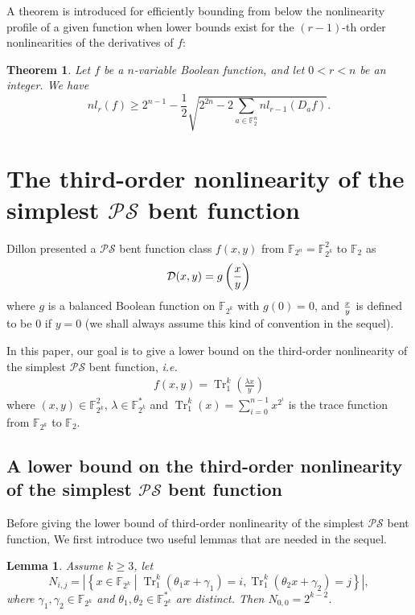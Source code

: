 \documentclass{article}
\newcommand{\F}{\mathbb{F}}
\newcommand{\0}{\textbf{0}}
\newcommand{\1}{\textbf{1}}
\newcommand{\TRACE}{\operatorname{Tr}_1^k}
\theoremstyle{plain}
\newtheorem{lemma}{Lemma}
\newtheorem{theorem}{Theorem}
\theoremstyle{nonumberplain}
\begin{document}
    A theorem is introduced for efficiently bounding from below 
    the nonlinearity profile of a given function when lower bounds exist
    for the $ (r-1) $-th order nonlinearities of the derivatives of $ f $:
   \begin{theorem}\cite{C2007book}\label{thm:High_order_nl_bound}
        Let $ f $ be a $ n $-variable Boolean function, and let $ 0<r<n $ be an integer. We have 
        \[nl_r(f)\ge 2^{n-1}-\frac{1}{2}\sqrt{2^{2n}-2\sum_{a\in\F_2^n}nl_{r-1}(D_af)}.\] 
   \end{theorem}
  
\section{The third-order nonlinearity of the simplest $ \mathcal{PS} $ bent function}

    Dillon presented a $ \mathcal{PS} $ bent function class $ f(x,y) $ from $ \F_{2^n}=\F_{2^k}^2 $ 
    to $ \F_2 $ as 
    \begin{eqnarray*}\label{Eqn_PS_bent}
        \mathcal{D}(x,y)=g\left({x\over y}\right)
    \end{eqnarray*}
    where $ g $ is a balanced Boolean function on $ \F_{2^{k}} $ with $ g(0)=0 $, 
    and ${ x\over y }$ is defined to be $ 0 $ if $ y=0 $ 
    (we shall always assume this kind of convention in the sequel).

    In this paper, our goal is to give a lower bound on the third-order nonlinearity of the simplest 
    $ \mathcal{PS} $ bent function, \emph{i.e.}
    \begin{eqnarray}\label{sub-bent}
        f(x,y)=\TRACE\left(\frac{\lambda x}{y}\right)
    \end{eqnarray}
    where $ (x,y)\in\F_{2^k}^2 $, $ \lambda\in\F_{2^k}^{*} $ 
    and $ \TRACE(x)=\sum\limits_{i=0}^{n-1}x^{2^i} $ is the trace function from
    $ \F_{2^k} $ to $ \F_2 $.

    \subsection{A lower bound on the third-order nonlinearity of the simplest $ \mathcal{PS} $ bent function}

    Before giving the lower bound of third-order nonlinearity of the simplest $ \mathcal{PS} $ bent function, 
    We first introduce two useful lemmas that are needed in the sequel.

    \begin{lemma}\label{lemma:N_ij_trace}
        Assume  $ k\ge 3 $, let 
        \[ N_{i,j} =\left\lvert\left\{x\in\F_{2^k}\middle|\TRACE\left(\theta_1x+\gamma_1\right)=i,\TRACE\left(\theta_2x+\gamma_2\right)=j\right\}\right\rvert, \]
        where  $ \gamma_1,\gamma_2\in\F_{2^k} $ and $ \theta_1,\theta_2\in\F_{2^k}^* $ are distinct. Then $ N_{0,0} =2^{k-2} $.
    \end{lemma}   
   
\end{document}
